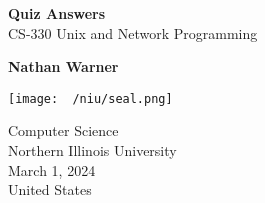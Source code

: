 \documentclass{report}
\title{\Huge{}}
\author{\huge{Nathan Warner}}
\date{\huge{}}
\begin{document}
        \begin{titlepage}
       \begin{center}
           \vspace*{1cm}
    
           \textbf{Quiz Answers} \\
           CS-330 Unix and Network Programming
    
           \vspace{0.5cm}
            
                
           \vspace{1.5cm}
    
           \textbf{Nathan Warner}
    
           \vfill
                
                
           \vspace{0.8cm}
         
           \texttt{[image: ~/niu/seal.png]}
                
           Computer Science \\
           Northern Illinois University\\
           March 1, 2024 \\
           United States\\
           
                
       \end{center}
    \end{titlepage}
    \tableofcontents
    \pagebreak 
\end{document}
